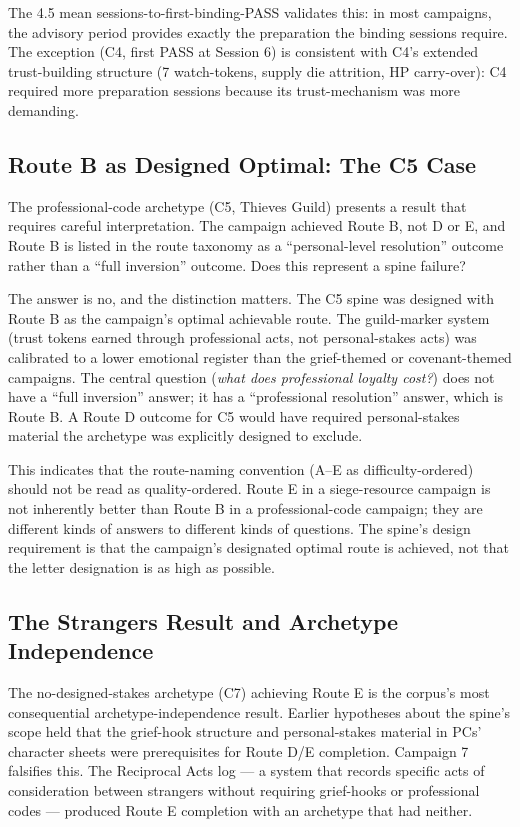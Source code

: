 The 4.5 mean sessions-to-first-binding-PASS validates this: in most campaigns,
the advisory period provides exactly the preparation the binding sessions require.
The exception (C4, first PASS at Session 6) is consistent with C4's extended
trust-building structure (7 watch-tokens, supply die attrition, HP carry-over):
C4 required more preparation sessions because its trust-mechanism was more
demanding.

\subsection{Route B as Designed Optimal: The C5 Case}

The professional-code archetype (C5, Thieves Guild) presents a result that
requires careful interpretation. The campaign achieved Route B, not D or E,
and Route B is listed in the route taxonomy as a ``personal-level resolution''
outcome rather than a ``full inversion'' outcome. Does this represent a spine
failure?

The answer is no, and the distinction matters. The C5 spine was designed with
Route B as the campaign's optimal achievable route. The guild-marker system
(trust tokens earned through professional acts, not personal-stakes acts)
was calibrated to a lower emotional register than the grief-themed or
covenant-themed campaigns. The central question (\textit{what does professional
loyalty cost?}) does not have a ``full inversion'' answer; it has a
``professional resolution'' answer, which is Route B. A Route D outcome for
C5 would have required personal-stakes material the archetype was explicitly
designed to exclude.

This indicates that the route-naming convention (A--E as difficulty-ordered)
should not be read as quality-ordered. Route E in a siege-resource campaign is
not inherently better than Route B in a professional-code campaign; they are
different kinds of answers to different kinds of questions. The spine's design
requirement is that the campaign's designated optimal route is achieved, not that
the letter designation is as high as possible.

\subsection{The Strangers Result and Archetype Independence}

The no-designed-stakes archetype (C7) achieving Route E is the corpus's most
consequential archetype-independence result. Earlier hypotheses about the spine's
scope held that the grief-hook structure and personal-stakes material in PCs'
character sheets were prerequisites for Route D/E completion. Campaign 7
falsifies this. The Reciprocal Acts log --- a system that records specific acts
of consideration between strangers without requiring grief-hooks or professional
codes --- produced Route E completion with an archetype that had neither.

